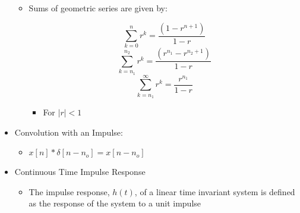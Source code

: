 \begin{itemize}
\begin{itemize}
      \item Sums of geometric series are given by:

        $$\sum_{k=0}^{n}r^k=\frac{(1-r^{n+1})}{1-r}$$
        $$\sum_{k=n_1}^{n_2}r^k=\frac{(r^{n_1}-r^{n_2+1})}{1-r}$$
        $$\sum_{k=n_1}^{\infty}r^k=\frac{r^{n_1}}{1-r}$$

        \begin{itemize}

          \item For $|r|<1$

        \end{itemize}

    \end{itemize}
    
  \item Convolution with an Impulse:

    \begin{itemize}

      \item $x[n]*\delta[n-n_o]=x[n-n_o]$

    \end{itemize}

  \item Continuous Time Impulse Response

    \begin{itemize}

      \item The impulse response, $h(t)$, of a linear time invariant system is defined as the response of the system to a unit impulse

    \end{itemize}

\end{itemize}



